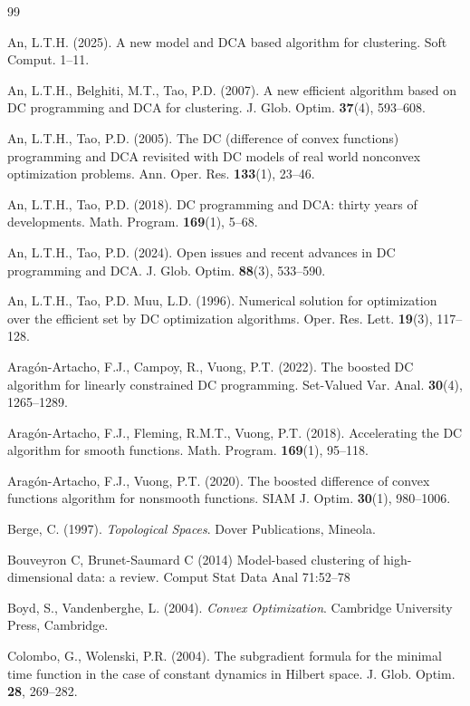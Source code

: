 \documentclass[11pt]{article}
\theoremstyle{definition}
\newcommand{\1}{\mathbf{1}}
\begin{document}
\begin{thebibliography}{99}

An, L.T.H. (2025). A new model and DCA based algorithm for clustering. Soft Comput. 1--11.

An, L.T.H., Belghiti, M.T., Tao, P.D. (2007). A new efficient algorithm based on DC programming and DCA for clustering. J. Glob. Optim. \textbf{37}(4), 593--608.

An, L.T.H., Tao, P.D. (2005). The DC (difference of convex functions) programming and DCA revisited with DC models of real world nonconvex optimization problems. Ann. Oper. Res. \textbf{133}(1), 23--46.

An, L.T.H., Tao, P.D. (2018). DC programming and DCA: thirty years of developments. Math. Program. \textbf{169}(1), 5--68.

An, L.T.H., Tao, P.D. (2024). Open issues and recent advances in DC programming and DCA. J. Glob. Optim. \textbf{88}(3), 533--590.

An, L.T.H., Tao, P.D. Muu, L.D. (1996). Numerical solution for optimization over the efficient set by DC optimization algorithms. Oper. Res. Lett. \textbf{19}(3), 117--128.

Aragón-Artacho, F.J., Campoy, R., Vuong, P.T. (2022). The boosted DC algorithm for linearly constrained DC programming. Set-Valued Var. Anal. \textbf{30}(4), 1265--1289.


Aragón-Artacho, F.J., Fleming, R.M.T., Vuong, P.T. (2018). Accelerating the DC algorithm for smooth functions. Math. Program. \textbf{169}(1), 95--118.

Aragón-Artacho, F.J., Vuong, P.T. (2020). The boosted difference of convex functions algorithm for nonsmooth functions. SIAM J. Optim. \textbf{30}(1), 980--1006.


Berge, C. (1997). \emph{Topological Spaces}. Dover Publications, Mineola.

Bouveyron C, Brunet-Saumard C (2014) Model-based clustering of
high-dimensional data: a review. Comput Stat Data Anal 71:52--78

Boyd, S., Vandenberghe, L. (2004). \emph{Convex Optimization}. Cambridge University Press, Cambridge.

Colombo, G., Wolenski, P.R. (2004). The subgradient formula for the minimal time function in the case of constant dynamics in Hilbert space. J. Glob. Optim. \textbf{28}, 269--282.


\end{thebibliography}
\end{document}
